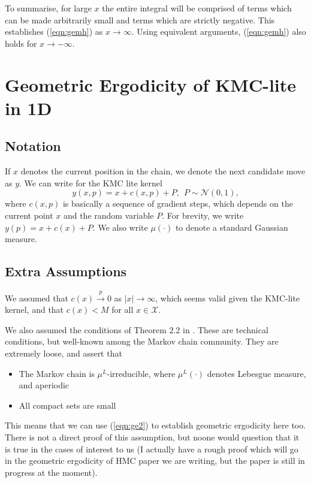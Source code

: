 \documentclass{article}
\newcommand{\X}{\mathcal{X}}
\begin{document}
To summarise, for large $x$ the entire integral will be comprised of terms which can be made arbitrarily small and terms which are strictly negative. This establishes (\ref{eqn:gemh}) as $x \to \infty$. Using equivalent arguments, (\ref{eqn:gemh}) also holds for $x \to -\infty$.

\section{Geometric Ergodicity of KMC-lite in 1D}

\subsection{Notation}

If $x$ denotes the current position in the chain, we denote the next candidate move as $y$.  We can write for the KMC lite kernel
\[
y(x,p) = x + c(x,p) + P, ~~ P \sim \mathcal{N}(0,1),
\]
where $c(x,p)$ is basically a sequence of gradient steps, which depends on the current point $x$ and the random variable $P$.  For brevity, we write $y(p) = x + c(x) + P$.  We also write $\mu(\cdot)$ to denote a standard Gaussian measure.

\subsection{Extra Assumptions}

We assumed that $c(x) \xrightarrow{p} 0$ as $|x| \to \infty$, which seems valid given the KMC-lite kernel, and that $c(x) < M$ for all $x \in \X$.

We also assumed the conditions of Theorem 2.2 in \cite{roberts1996geometric}.  These are technical conditions, but well-known among the Markov chain community.  They are extremely loose, and assert that
\begin{itemize}
\item The Markov chain is $\mu^L$-irreducible, where $\mu^L(\cdot)$ denotes Lebesgue measure, and aperiodic
\item All compact sets are small
\end{itemize}
This means that we can use (\ref{eqn:ge2}) to establish geometric ergodicity here too.  There is not a direct proof of this assumption, but noone would question that it is true in the cases of interest to us (I actually have a rough proof which will go in the geometric ergodicity of HMC paper we are writing, but the paper is still in progress at the moment).
\end{document}
